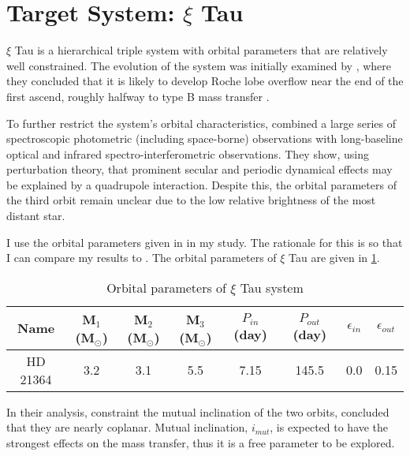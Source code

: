 \section{Target System: $\xi$ Tau}

$\xi$ Tau is a hierarchical triple system with orbital parameters that are relatively well constrained. The evolution of the system was initially examined by \cite{de2014evolution}, where they  concluded that it is likely to develop Roche lobe overflow near the end of the first ascend, roughly halfway to type B mass transfer \citep{kippenhahn1967entwicklung}.

To further restrict the system's orbital characteristics, \cite{nemravova2016xitauri} combined a large series of spectroscopic photometric (including space-borne) observations with long-baseline optical and infrared spectro-interferometric observations. They show, using perturbation theory, that prominent secular and periodic dynamical effects may be explained by a quadrupole interaction. Despite this, the orbital parameters of the third orbit remain unclear due to the low relative brightness of the most distant star.

I use the orbital parameters given in \cite{2010yCat..73890925T} in my study. The rationale for this is so that I can compare my results to \cite{de2014evolution}. The orbital parameters of $\xi$ Tau are given in \cref{tab:system_orbit_param}.

\begin{table}[H]
    \centering
    \begin{tabular}{|c c c c c c c c|}
       Name & M$_1$ (M$_{\odot}$) & M$_2$ (M$_{\odot}$) &
       M$_3$ (M$_{\odot}$) & $P_{in}$ (day) &
       $P_{out}$ (day) & $\epsilon_{in}$ &
       $\epsilon_{out}$ \\
       \hline
       HD 21364 & 3.2 & 3.1 & 5.5 & 7.15 & 145.5 & 0.0 & 0.15
    \end{tabular}
    \caption{ Orbital parameters of $\xi$ Tau system}
    \label{tab:system_orbit_param}
\end{table}

In their analysis, \cite{nemravova2016xitauri} constraint  the mutual inclination of the two orbits, concluded that they are nearly coplanar. Mutual inclination, $i_{mut}$, is expected to have the strongest effects on the mass transfer, thus it is a free parameter to be explored.
